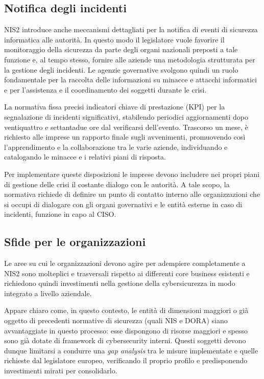 \subsection{Notifica degli incidenti}
NIS2 introduce anche meccanismi dettagliati per la notifica di eventi di sicurezza informatica alle autorità. In questo 
modo il legislatore vuole favorire il monitoraggio della sicurezza da parte degli organi nazionali preposti a tale
funzione e, al tempo stesso, fornire alle aziende una metodologia strutturata per la gestione degli incidenti. Le 
agenzie governative svolgono quindi un ruolo fondamentale per la raccolta delle informazioni su minacce e attacchi
informatici e per l'assistenza e il coordinamento dei soggetti durante le crisi.

La normativa fissa precisi indicatori chiave di prestazione (KPI) per la segnalazione di incidenti significativi, stabilendo periodici aggiornamenti 
dopo ventiquattro e settantadue ore dal verificarsi dell'evento. Trascorso un mese, è richiesto alle imprese un 
rapporto finale sugli avvenimenti, promuovendo così l'apprendimento e la collaborazione tra le varie aziende, 
individuando e catalogando le minacce e i relativi piani di risposta.

Per implementare queste disposizioni le imprese devono includere nei propri piani di gestione delle crisi il 
costante dialogo con le autorità. A tale scopo, la normativa richiede di definire un punto di contatto interno
alle organizzazioni che si occupi di dialogare con gli organi governativi e le entità esterne in caso di incidenti,
funzione in capo al CISO. 


\subsection{Sfide per le organizzazioni}
Le aree su cui le organizzazioni devono agire per adempiere completamente a NIS2 sono molteplici e trasversali
rispetto ai differenti core business esistenti e richiedono quindi investimenti nella gestione della cybersicurezza
in modo integrato a livello aziendale.

Appare chiaro come, in questo contesto, le entità di dimensioni maggiori o già oggetto di precedenti normative di 
sicurezza (quali NIS e DORA) siano avvantaggiate in questo processo: esse dispongono di risorse maggiori e spesso
sono già dotate di framework di cybersecurity interni. Questi soggetti devono dunque limitarsi a condurre una 
\textit{gap analysis} tra le misure implementate e quelle richieste dal legislatore europeo, verificando il 
proprio profilo e predisponendo investimenti mirati per consolidarlo.

